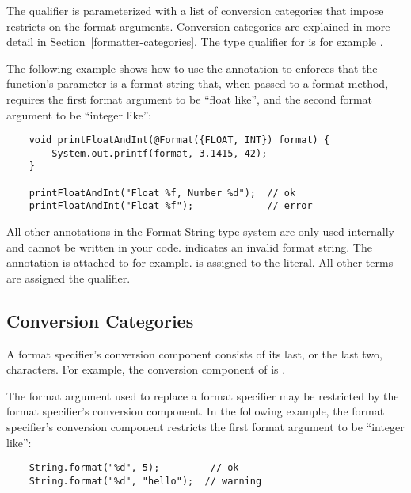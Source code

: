 The  qualifier is parameterized with
a list of conversion categories that impose restricts on the format arguments.
Conversion categories are explained in more detail in
Section~\ref{formatter-categories}.  The type qualifier for  is
for example .

The following example shows how to use the  annotation to
enforces that the function's parameter is a format string that, when
passed to a format method, requires the first format argument to be ``float like'',
and the second format argument to be ``integer like'':

\begin{Verbatim}
    void printFloatAndInt(@Format({FLOAT, INT}) format) {
        System.out.printf(format, 3.1415, 42);
    } 

    printFloatAndInt("Float %f, Number %d");  // ok
    printFloatAndInt("Float %f");             // error
\end{Verbatim}

\noindent All other annotations in the Format String type system are only used
internally and cannot be written in your code.
 indicates an invalid format
string. The annotation is attached to 
for example.   is assigned to the
 literal. All other terms are assigned the
 qualifier.

\subsection{Conversion Categories\label{formatter-categories}}

A format specifier's conversion component consists of its last, or the last two,
characters.  For example, the conversion component of  is .

The format argument used to replace a format specifier may be restricted 
by the format specifier's conversion component. In the following example, the
format specifier's conversion component  restricts the first format argument
to be ``integer like'':

\begin{Verbatim}
    String.format("%d", 5);         // ok
    String.format("%d", "hello");  // warning
\end{Verbatim}

